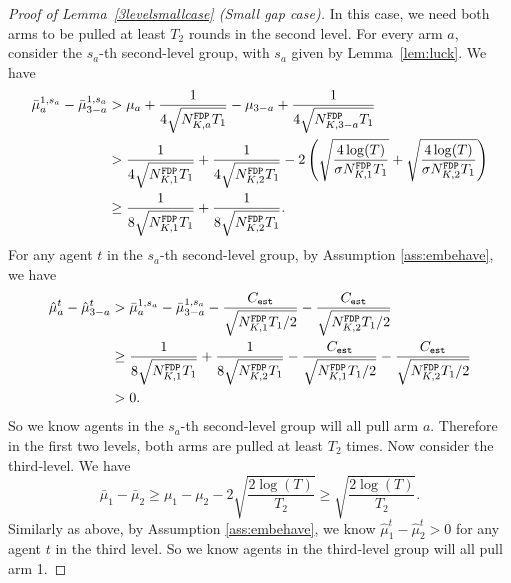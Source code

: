 \begin{proof}[Proof of Lemma~\ref{3levelsmallcase} (Small gap case)]
  In this case, we need both arms to be pulled at least $T_2$ rounds
  in the second level. For every arm $a$, consider the $s_a$-th
  second-level group, with $s_a$ given by Lemma~\ref{lem:luck}. We
  have
\begin{align*}
\bar{\mu}_a^{1,s_a} - \bar{\mu}_{3-a}^{1,s_a} &> \mu_a + \frac{1}{4\sqrt{\fdpN T_1}} -\mu_{3-a} +\frac{1}{4\sqrt{\fdpN[3-a]T_1}} \\
&> \frac{1}{4\sqrt{\fdpN[1]T_1}}+ \frac{1}{4\sqrt{\fdpN[2]T_1}} - 2\left(\sqrt{\frac{4\log(T)}{\NG\fdpN[1]T_1}}
+ \sqrt{\frac{4\log(T)}{\NG\fdpN[2]T_1}}\right) \\
&\geq \frac{1}{8\sqrt{\fdpN[1]T_1}}+ \frac{1}{8\sqrt{\fdpN[2]T_1}}.
\end{align*}
For any agent $t$ in the $s_a$-th second-level group, by Assumption \ref{ass:embehave}, we have
\begin{align*}
\hat{\mu}_a^t - \hat{\mu}_{3-a}^t &>\bar{\mu}_a^{1,s_a} - \bar{\mu}_{3-a}^{1,s_a} - \frac{\estC}{\sqrt{\fdpN[1]T_1/2}} - \frac{\estC}{\sqrt{\fdpN[2]T_1/2}}\\
&\geq   \frac{1}{8\sqrt{\fdpN[1]T_1}}+ \frac{1}{8\sqrt{\fdpN[2]T_1}}- \frac{\estC}{\sqrt{\fdpN[1]T_1/2}} - \frac{\estC}{\sqrt{\fdpN[2]T_1/2}}\\
 &> 0.
\end{align*}
So we know agents in the $s_a$-th second-level group will all pull arm $a$. Therefore in the first two levels, both arms are pulled at least $T_2$ times. Now consider the third-level. We have
\[
\bar{\mu}_1 - \bar{\mu}_2  \geq \mu_1 -\mu_2 - 2\sqrt{\frac{2\log(T)}{T_2}} \geq \sqrt{\frac{2\log(T)}{T_2}}.
\]
Similarly as above, by Assumption \ref{ass:embehave}, we know $\hat{\mu}_1^t - \hat{\mu}_2^t > 0$ for any agent $t$ in the third level. So we know agents in the third-level group will all pull arm 1.
\end{proof} 